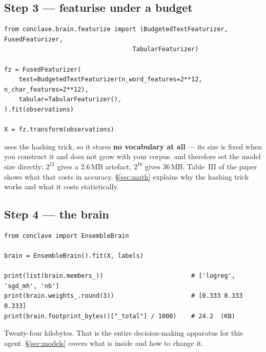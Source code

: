 \subsection{Step 3 --- featurise under a budget}

\begin{codebox}[Featurisation]
\begin{lstlisting}[style=py]
from conclave.brain.featurize import (BudgetedTextFeaturizer, FusedFeaturizer,
                                   TabularFeaturizer)

fz = FusedFeaturizer(
    text=BudgetedTextFeaturizer(n_word_features=2**12, n_char_features=2**12),
    tabular=TabularFeaturizer(),
).fit(observations)

X = fz.transform(observations)
\end{lstlisting}
\end{codebox}

\begin{keybox}
 uses the hashing trick, so it stores
\textbf{no vocabulary at all} --- its size is fixed when you construct it and
does not grow with your corpus.  and
 therefore set the model size directly:
$2^{12}$ gives a 2.6\,MB artefact, $2^{16}$ gives 36\,MB. Table~III of the
paper shows what that costs in accuracy. \S\ref{sec:math} explains why the
hashing trick works and what it costs statistically.
\end{keybox}

\subsection{Step 4 --- the brain}

\begin{codebox}
\begin{lstlisting}[style=py]
from conclave import EnsembleBrain

brain = EnsembleBrain().fit(X, labels)

print(list(brain.members_))                        # ['logreg', 'sgd_mh', 'nb']
print(brain.weights_.round(3))                     # [0.333 0.333 0.333]
print(brain.footprint_bytes()["_total"] / 1000)    # 24.2  (KB)
\end{lstlisting}
\end{codebox}

\noindent Twenty-four kilobytes. That is the entire decision-making apparatus
for this agent. \S\ref{sec:models} covers what is inside and how to change it.


